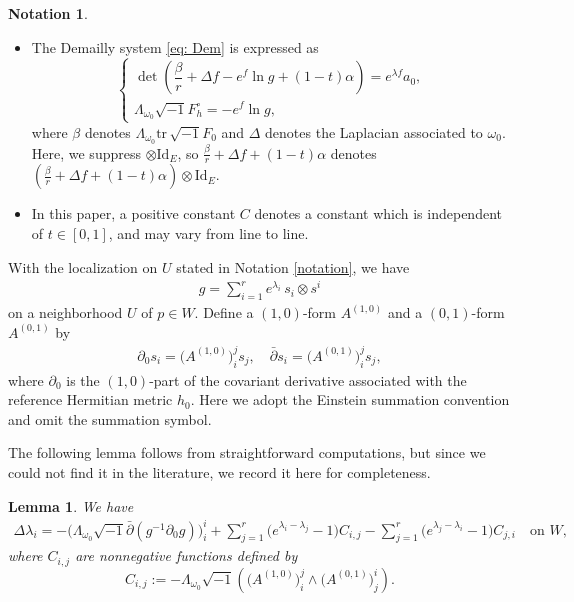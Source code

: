 \documentclass[a4, 12pt, 
]{amsart}
\numberwithin{equation}{section}
\theoremstyle{plain}
\newtheorem{lem}[equation]{Lemma}
\theoremstyle{definition}
\newtheorem{notation}[equation]{Notation}
\theoremstyle{remark}
\begin{document}
\begin{notation}
\begin{itemize}
    \item 
    The Demailly system \eqref{eq: Dem} is expressed as
    \begin{equation}\label{eq: Dem'}
    \begin{cases}
        \det \left(\dfrac{\beta}{r}+\Delta f-e^f\ln g+(1-t)\alpha\right)=e^{\lambda f}a_0,\\
        \Lambda_{\omega_0}\sqrt{-1}F_h^\circ=-e^f \ln g,
    \end{cases}
    \end{equation}
    where $\beta$ denotes $\Lambda_{\omega_0}\mathrm{tr}\, \sqrt{-1}F_0$ and $\Delta$ denotes the Laplacian associated to $\omega_0$. 
    Here, we suppress $\otimes\mathrm{Id}_E$, so $\frac{\beta}{r}+\Delta f+(1-t)\alpha$ denotes $(\frac{\beta}{r}+\Delta f+(1-t)\alpha)\otimes\mathrm{Id}_E$.

    \item In this paper, a positive constant $C$ denotes a constant which is independent of $t\in[0,1]$, and may vary from line to line.
\end{itemize}
\end{notation}

With the localization on $U$ stated in Notation \ref{notation}, we have
\begin{align*}
    g=\sum_{i=1}^r e^{\lambda_i}\, s_i\otimes s^i
\end{align*}
on a neighborhood $U$ of $p\in W$. Define a $(1,0)$-form $A^{(1,0)}$ and a $(0,1)$-form $A^{(0,1)}$ by
\begin{align*}
    \partial_0 s_i=\big(A^{(1,0)}\big)^j_i s_j, \quad \bar{\partial} s_i=\big(A^{(0,1)}\big)^j_i s_j,
\end{align*}
where $\partial_0$ is the $(1,0)$-part of the covariant derivative associated with the reference Hermitian metric $h_0$. Here we adopt the Einstein summation convention and omit the summation symbol.

The following lemma follows from straightforward computations, but since we could not find it in the literature, we record it here for completeness.
\begin{lem}\label{lem: laplace}
    We have
    \begin{equation}\label{eq: laplace}
    \begin{aligned}
        \Delta\lambda_i=-\big(\Lambda_{\omega_0}\sqrt{-1}\bar{\partial}(g^{-1}\partial_0g)\big)^i_i+\sum_{j=1}^r\big(e^{\lambda_i-\lambda_j}-1\big)C_{i,j}
    -\sum_{j=1}^r\big(e^{\lambda_j-\lambda_i}-1\big)C_{j,i} \quad \text{on $W$},
    \end{aligned}
    \end{equation}
    where  $C_{i,j}$ are nonnegative functions defined by 
    $$C_{i,j}:=-\Lambda_{\omega_0}\sqrt{-1}\left(\big(A^{(1,0)}\big)^j_i \wedge\big(A^{(0,1)}\big)^i_j\right).$$
\end{lem}
\end{document}
